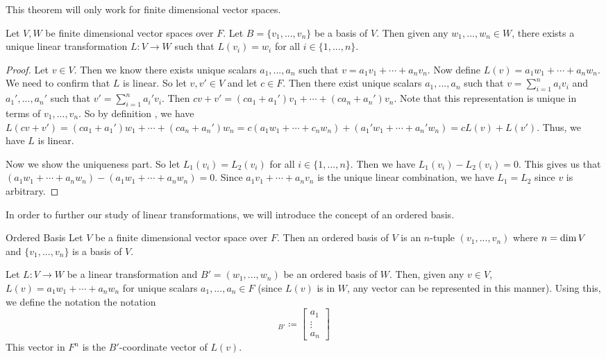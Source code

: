 \documentclass[main.tex]{subfiles}
\begin{document}
    This theorem will only work for finite dimensional vector spaces. 
    \begin{thrm}{}{}
        Let $V,W$ be finite dimensional vector spaces over $F$. Let $B = \{v_1, ..., v_n\}$ be a basis of $V$. Then given any $w_1, ..., w_n\in W$, there exists a unique linear transformation $L: V\to W$ such that $L(v_i) = w_i$ for all $i \in \{1, ..., n\}$.
    \end{thrm}
    \begin{proof}
        Let $v\in V$. Then we know there exists unique scalars $a_1, ..., a_n$ such that $v = a_1v_1 + \cdots + a_nv_n$. Now define $L(v) = a_1w_1 + \cdots + a_nw_n$. We need to confirm that $L$ is linear. So let $v, v'\in V$ and let $c\in F$. Then there exist unique scalars $a_1, ..., a_n$ such that $v = \sum_{i=1}^n a_iv_i$ and $a_1', ..., a_n'$ such that $v' = \sum_{i=1}^n a_i'v_i$. Then $cv + v' = (ca_1 + a_1')v_1 + \cdots + (ca_n + a_n')v_n$. Note that this representation is unique in terms of $v_1, ..., v_n$. So by definition , we have $L(cv + v') = (ca_1 + a_1')w_1 + \cdots + (ca_n + a_n')w_n = c(a_1w_1 + \cdots + c_nw_n) + (a_1'w_1 + \cdots + a_n'w_n) = cL(v) + L(v')$. Thus, we have $L$ is linear. \par 

        Now we show the uniqueness part. So let $L_1(v_i) = L_2(v_i)$ for all $i\in \{1, ..., n\}$. Then we have $L_1(v_i) - L_2(v_i) = 0$. This gives us that $(a_1w_1 + \cdots + a_nw_n) - (a_1w_1 + \cdots + a_nw_n) = 0$. Since $a_1v_1 + \cdots + a_nv_n$ is the unique linear combination, we have $L_1 = L_2$ since $v$ is arbitrary.
    \end{proof}

    In order to further our study of linear transformations, we will introduce the concept of an ordered basis. 
    \begin{defn}{Ordered Basis}{}
        Let $V$ be a finite dimensional vector space over $F$. Then an ordered basis of $V$ is an $n$-tuple $(v_1, ..., v_n)$ where $n = \operatorname{dim} V$ and $\{v_1, ..., v_n\}$ is a basis of $V$.
    \end{defn}
    Let $L: V\to W$ be a linear transformation and $B' = (w_1, ..., w_n)$ be an ordered basis of $W$. Then, given any $v\in V$, $L(v) = a_1w_1 + \cdots + a_nw_n$ for unique scalars $a_1, ..., a_n\in F$ (since $L(v)$ is in $W$, any vector can be represented in this manner). Using this, we define the notation the notation 
    \begin{equation}
        [ L(v) ]_{B'} \coloneqq \begin{bmatrix}
            a_1 \\ \vdots \\ a_n
        \end{bmatrix}
    \end{equation}
    This vector in $F^n$ is the $B'$-coordinate vector of $L(v)$.
\end{document}
